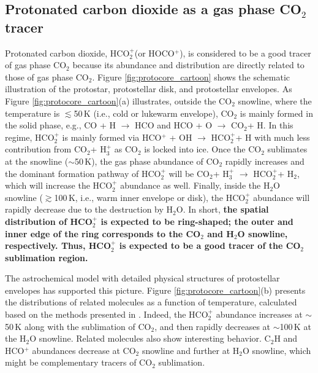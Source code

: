 \documentclass[12pt,a4paper]{article}  %
\newcommand{\carbondioxide}{CO$_2$\xspace}
\newcommand{\protonatedcarbondioxide}{HCO$_2^+$\xspace}
\newcommand{\water}{H$_2$O\xspace}
\begin{document}
\subsection{Protonated carbon dioxide as a gas phase \carbondioxide tracer}
Protonated carbon dioxide, \protonatedcarbondioxide (or HOCO$^+$), is considered to be a good tracer of gas phase \carbondioxide because its abundance and distribution are directly related to those of gas phase \carbondioxide \citep[e.g.,][]{Sakai08}. Figure \ref{fig:protocore_cartoon} shows the schematic illustration of the protostar, protostellar disk, and protostellar envelopes. As Figure \ref{fig:protocore_cartoon}(a) illustrates, outside the \carbondioxide snowline, where the temperature is $\lesssim$50\,K (i.e., cold or lukewarm envelope), \carbondioxide is mainly formed in the solid phase, e.g., CO + H $\longrightarrow$ HCO and HCO + O $\longrightarrow$ \carbondioxide + H. In this regime, \protonatedcarbondioxide is mainly formed via HCO$^+$ + OH $\longrightarrow$ \protonatedcarbondioxide + H with much less contribution from \carbondioxide + H$_3^+$ as \carbondioxide is locked into ice. Once the \carbondioxide sublimates at the snowline ($\sim$50\,K), the gas phase abundance of \carbondioxide rapidly increases and the dominant formation pathway of \protonatedcarbondioxide will be \carbondioxide + H$_3^+$ $\longrightarrow$ \protonatedcarbondioxide + H$_2$, which will increase the \protonatedcarbondioxide abundance as well. 
Finally, inside the \water snowline ($\gtrsim$100\,K, i.e., warm inner envelope or disk), the \protonatedcarbondioxide abundance will rapidly decrease due to the destruction by \water. In short, \textbf{the spatial distribution of \protonatedcarbondioxide is expected to be ring-shaped; the outer and inner edge of the ring corresponds to the \carbondioxide and \water snowline, respectively. Thus, \protonatedcarbondioxide is expected to be a good tracer of the \carbondioxide sublimation region.} 

The astrochemical model with detailed physical structures of protostellar envelopes has supported this picture. Figure \ref{fig:protocore_cartoon}(b) presents the distributions of related molecules as a function of temperature, calculated based on the methods presented in \citet{Aikawa20}. Indeed, the \protonatedcarbondioxide abundance increases at $\sim$50\,K along with the sublimation of \carbondioxide, and then rapidly decreases at $\sim$100\,K at the \water snowline. Related molecules also show interesting behavior. C$_2$H and HCO$^{+}$ abundances decrease at \carbondioxide snowline and further at \water snowline, which might be complementary tracers of \carbondioxide sublimation.  
\end{document}
